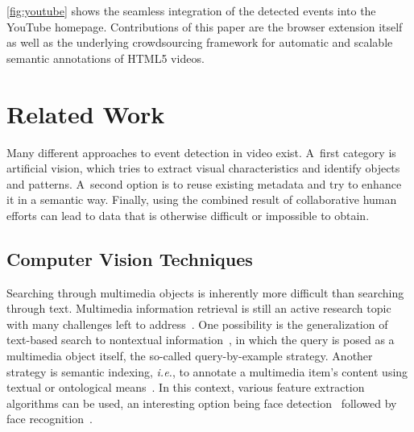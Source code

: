 \documentclass[runningheads,a4paper]{llncs}
\begin{document}
\autoref{fig:youtube} shows the seamless integration of the detected events into the YouTube homepage. Contributions of this paper are the browser extension itself as well as the underlying crowdsourcing framework for automatic and scalable semantic annotations of HTML5 videos. 

\section{Related Work} \label{sec:related-work}
Many different approaches to event detection in video exist.
A~first category is artificial vision, which tries to extract visual characteristics and identify objects and patterns.
A~second option is to reuse existing metadata and try to enhance it in a semantic way.
Finally, using the combined result of collaborative human efforts can lead to data that is otherwise difficult or impossible to obtain.

\subsection{Computer Vision Techniques}
Searching through multimedia objects is inherently more difficult than searching through text.
Multimedia information retrieval is still an active research topic with many challenges left to address~\cite{Hanjalic:2008}.
One possibility is the generalization of text-based search to nontextual information~\cite{Sivic:2008}, in which the query is posed as a multimedia object itself, the so-called query-by-example strategy.
Another strategy is semantic indexing, \emph{i.e.}, to annotate a multimedia item's content using textual or ontological means~\cite{Hauptmann:2008}.
In this context, various feature extraction algorithms can be used, an interesting option being face detection~\cite{ViolaJones} followed by face recognition~\cite{Verstockt:2009}.
\end{document}

